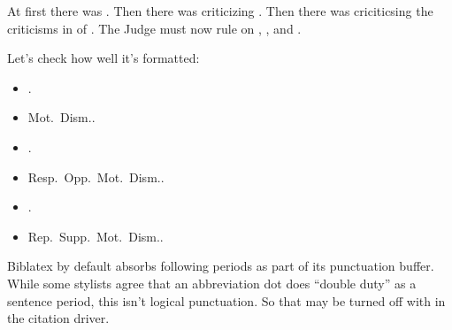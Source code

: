 \documentclass[english]{article}
\begin{document}
At first there was \cite{memo1}. Then there was \cite{memo2} criticizing
\cite{memo1}. Then there was \cite{memo3} criciticsing the criticisms in
\cite{memo2} of \cite{memo1}. The Judge must now rule on \cite{memo1},
\cite{memo2}, and \cite{memo3}.

Let's check how well it's formatted:

\begin{itemize}
\item \cite{memo1}.
\item Mot.\ Dism..
\item \cite{memo2}.
\item Resp.\ Opp.\ Mot.\ Dism..
\item \cite{memo3}.
\item Rep.\ Supp.\ Mot.\ Dism..
\end{itemize}

Biblatex by default absorbs following periods as part of its punctuation buffer. While some stylists agree that an abbreviation dot does ``double duty'' as a sentence period, this isn't logical punctuation. So that may be turned off with \texttt{\string\bibsentence} in the citation driver.

\printbibliography
\end{document}
